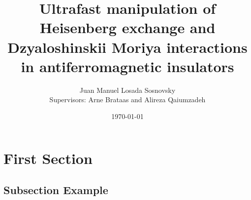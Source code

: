 \documentclass{beamer}
\title[Ultrafast manipulation of antiferromagnetic insulators]{Ultrafast manipulation of Heisenberg exchange and Dzyaloshinskii Moriya interactions in antiferromagnetic insulators} %
\author[Juan Manuel Losada Sosnovsky]{Juan Manuel Losada Sosnovsky\\[5mm]{\small Supervisors: Arne Brataas and Alireza Qaiumzadeh}}
\institute[NTNU] %
{
QuSpin (NTNU)
}
\date{\today} %
\begin{document}
\begin{frame}
\titlepage %
\end{frame}


\section{First Section} %

\subsection{Subsection Example} %
\end{document}
